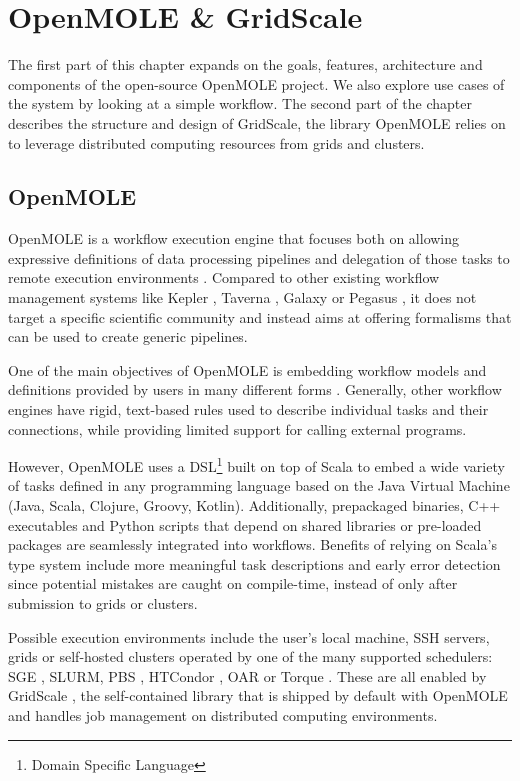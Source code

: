 \chapter{OpenMOLE \& GridScale}

The first part of this chapter expands on the goals, features, architecture and components of the open-source OpenMOLE project. We also explore use cases of the system by looking at a simple workflow. The second part of the chapter describes the structure and design of GridScale, the library OpenMOLE relies on to leverage distributed computing resources from grids and clusters.

\section{OpenMOLE}

OpenMOLE\cite{OpenMOLE} is a workflow execution engine that focuses both on allowing expressive definitions of data processing pipelines and delegation of those tasks to remote execution environments \cite{Leclaire2016}. Compared to other existing workflow management systems like Kepler \cite{Kepler}, Taverna \cite{Taverna}, Galaxy \cite{Galaxy} or Pegasus \cite{Pegasus}, it does not target a specific scientific community and instead aims at offering formalisms that can be used to create generic pipelines.

One of the main objectives of OpenMOLE is embedding workflow models and definitions provided by users in many different forms \cite{Reuillon2013}. Generally, other workflow engines have rigid, text-based rules used to describe individual tasks and their connections, while providing limited support for calling external programs. 

However, OpenMOLE uses a DSL\footnote{Domain Specific Language} built on top of Scala\cite{Scala} to embed a wide variety of tasks defined in any programming language based on the Java Virtual Machine (Java, Scala, Clojure, Groovy, Kotlin). Additionally, prepackaged binaries, C++ executables and Python scripts that depend on shared libraries or pre-loaded packages are seamlessly integrated into workflows. Benefits of relying on Scala's type system include more meaningful task descriptions and early error detection since potential mistakes are caught on compile-time, instead of only after submission to grids or clusters.

Possible execution environments include the user's local machine, SSH servers, grids or self-hosted clusters operated by one of the many supported schedulers: SGE \cite{SGE}, SLURM, PBS \cite{PBS}, HTCondor \cite{HTCondor}, OAR \cite{OAR} or Torque \cite{Torque}. These are all enabled by GridScale \cite{Reuillon2016}, the self-contained library that is shipped by default with OpenMOLE and handles job management on distributed computing environments.

